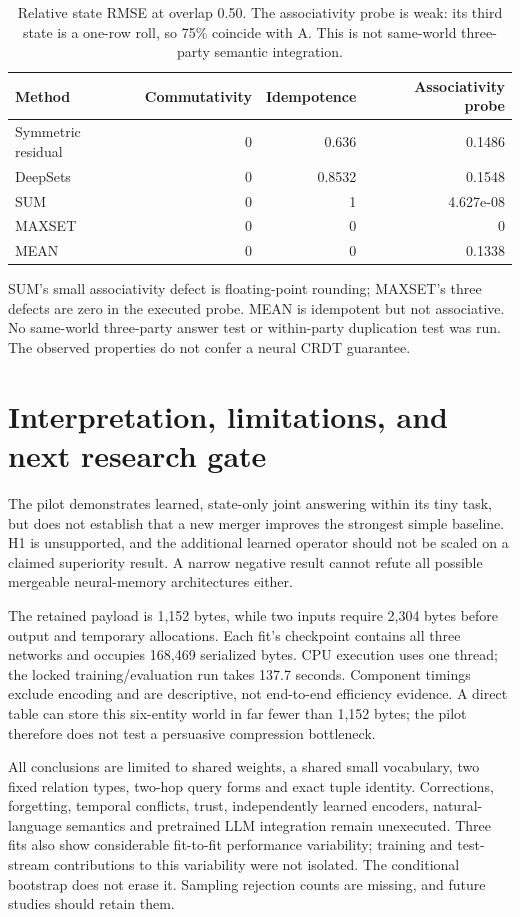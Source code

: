 \documentclass[10pt]{article}
\begin{document}
\begin{table}[ht]
\centering\small
\begin{tabular}{lrrr}\toprule
Method & Commutativity & Idempotence & Associativity probe\\\midrule
Symmetric residual & 0 & 0.636 & 0.1486 \\
DeepSets & 0 & 0.8532 & 0.1548 \\
SUM & 0 & 1 & 4.627e-08 \\
MAXSET & 0 & 0 & 0 \\
MEAN & 0 & 0 & 0.1338 \\
\bottomrule\end{tabular}
\caption{Relative state RMSE at overlap 0.50. The associativity probe is weak:
its third state is a one-row roll, so 75\% coincide with A. This is not
same-world three-party semantic integration.}
\label{tab:algebra}
\end{table}

SUM's small associativity defect is floating-point rounding; MAXSET's three
defects are zero in the executed probe. MEAN is idempotent but not associative.
No same-world three-party answer test or within-party duplication test was run.
The observed properties do not confer a neural CRDT guarantee.

\section{Interpretation, limitations, and next research gate}
The pilot demonstrates learned, state-only joint answering within its tiny
task, but does not establish that a new merger improves the strongest simple
baseline. H1 is unsupported, and the additional learned operator should not
be scaled on a claimed superiority result. A narrow negative result cannot
refute all possible mergeable neural-memory architectures either.

The retained payload is 1,152 bytes, while two inputs require 2,304 bytes before
output and temporary allocations. Each fit's checkpoint contains all three
networks and occupies 168,469 serialized bytes. CPU execution uses one thread;
the locked training/evaluation run takes 137.7 seconds. Component timings
exclude encoding and are descriptive, not end-to-end efficiency evidence.
A direct table can store this six-entity world in far fewer than 1,152 bytes;
the pilot therefore does not test a persuasive compression bottleneck.

All conclusions are limited to shared weights, a shared small vocabulary,
two fixed relation types, two-hop query forms and exact tuple identity.
Corrections, forgetting, temporal conflicts, trust, independently learned
encoders, natural-language semantics and pretrained LLM integration remain
unexecuted. Three fits also show considerable fit-to-fit performance variability;
training and test-stream contributions to this variability were not isolated.
The conditional bootstrap does not erase it. Sampling rejection counts are
missing, and future studies should retain them.
\end{document}
